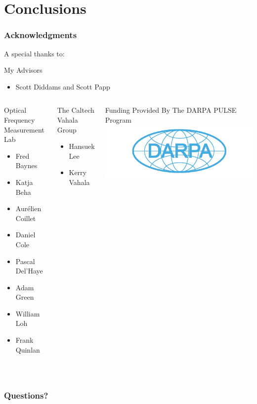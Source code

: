 \documentclass{beamer}
\begin{document}
\section{Conclusions}
\begin{frame}\frametitle{Acknowledgments}
A special thanks to:

\begin{block}{My Advisors}
\begin{itemize}
\item Scott Diddams and Scott Papp
\end{itemize}
\end{block}

\begin{columns}
\begin{block}{Optical Frequency Measurement Lab}
\begin{itemize}
\small
\item Fred Baynes
\item Katja Beha
\item Aur\'{e}lien Coillet
\item Daniel Cole
\item Pascal Del'Haye
\item Adam Green
\item William Loh
\item Frank Quinlan
\end{itemize}
\end{block}

\begin{block}{The Caltech Vahala Group}
\begin{itemize}
\small
\item Hansuek Lee
\item Kerry Vahala
\end{itemize}
\end{block}

\begin{block}{Funding Provided By}
\small
The DARPA PULSE Program
\includegraphics[width=1.1\textwidth]{Images/DARPA_logo.png}
\end{block}

\end{columns}

\

\end{frame}

\begin{frame}\frametitle{Questions?}
\end{frame}
\end{document}
